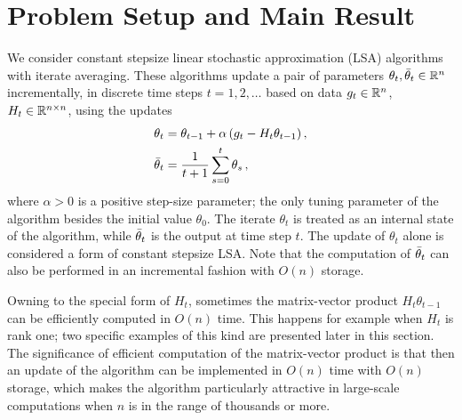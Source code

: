 \section{Problem Setup and Main Result}\label{sec:prob}
%
We consider constant stepsize linear stochastic approximation (LSA) algorithms with iterate averaging.
These algorithms update a pair of parameters $\theta_t,\bar{\theta}_t\in \mathbb{R}^n$ incrementally, in discrete time steps $t=1,2,\dots$
based on data $g_t\in \mathbb{R}^n$, $H_t\in \mathbb{R}^{n\times n}$, using the updates
\begin{subequations}
\label{eq:lsa} %
\begin{align}
\theta_{t} & =\theta_{t-1}+\alpha\,(g_t-H_t\theta_{t-1})\,, \label{eq:lsa1}\\
 \bar{\theta}_t & =  \frac{1}{t+1}\sum_{s=0}^{t} \theta_s\,, \label{eq:rp}
\end{align}
\end{subequations}
where $\alpha>0$ is a positive step-size parameter; the only tuning parameter of the algorithm besides the 
initial value $\theta_0$.
The iterate $\theta_t$ is treated as an internal state of the algorithm, while $\bar{\theta}_t$ is the output at time step $t$.
The update of $\theta_t$ alone is considered a form of constant stepsize LSA.
Note that the computation of $\bar{\theta}_t$ can also be performed in an incremental fashion with $O(n)$ storage.

Owning to the special form of $H_t$, sometimes the matrix-vector product $H_t \theta_{t-1}$ 
can be efficiently computed in $O(n)$ time.
This happens for example when $H_t$ is rank one; two specific examples of this kind are presented later in this section.
The significance of efficient computation of the matrix-vector product is that then an update of the algorithm
can be implemented in $O(n)$ time with $O(n)$ storage,
which makes the algorithm particularly attractive in large-scale computations when $n$ is in the range of thousands or more.

